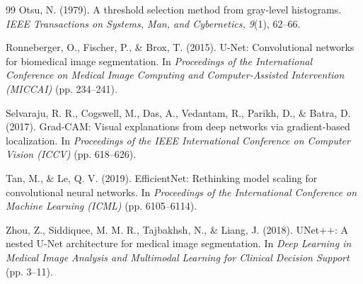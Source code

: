 \documentclass[final,5p,times,twocolumn,authoryear]{elsarticle}
\begin{document}
\begin{thebibliography}{99}
Otsu, N. (1979). A threshold selection method from gray-level histograms. \textit{IEEE Transactions on Systems, Man, and Cybernetics, 9}(1), 62--66.

Ronneberger, O., Fischer, P., \& Brox, T. (2015). U-Net: Convolutional networks for biomedical image segmentation. In \textit{Proceedings of the International Conference on Medical Image Computing and Computer-Assisted Intervention (MICCAI)} (pp. 234--241).

Selvaraju, R. R., Cogswell, M., Das, A., Vedantam, R., Parikh, D., \& Batra, D. (2017). Grad-CAM: Visual explanations from deep networks via gradient-based localization. In \textit{Proceedings of the IEEE International Conference on Computer Vision (ICCV)} (pp. 618--626).

Tan, M., \& Le, Q. V. (2019). EfficientNet: Rethinking model scaling for convolutional neural networks. In \textit{Proceedings of the International Conference on Machine Learning (ICML)} (pp. 6105--6114).

Zhou, Z., Siddiquee, M. M. R., Tajbakhsh, N., \& Liang, J. (2018). UNet++: A nested U-Net architecture for medical image segmentation. In \textit{Deep Learning in Medical Image Analysis and Multimodal Learning for Clinical Decision Support} (pp. 3--11).

\end{thebibliography}
\end{document}
